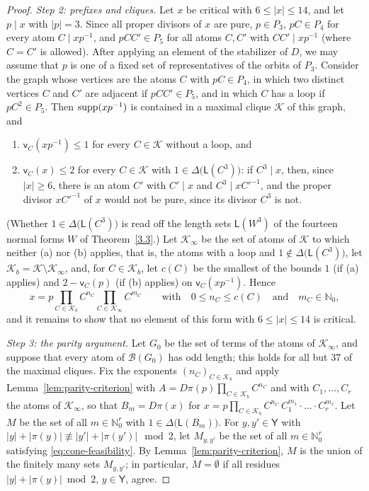 \documentclass[a4paper, 10pt]{amsart}
\theoremstyle{plain}
\theoremstyle{definition}
\theoremstyle{definition}
\newcommand{\N}{\mathbb N}
\numberwithin{equation}{section}
\begin{document}
\begin{proof}
\emph{Step 2: prefixes and cliques.}  Let $x$ be critical with
$6 \le |x| \le 14$, and let $p \mid x$ with $|p| = 3$.  Since all proper divisors of $x$ are
pure, $p \in P_3$, $pC \in P_4$ for every atom $C \mid xp^{-1}$, and
$pCC' \in P_5$ for all atoms $C, C'$ with $CC' \mid xp^{-1}$ (where $C = C'$ is
allowed).  After applying an element of the stabilizer of $D$, we may assume
that $p$ is one of a fixed set of representatives of the orbits of $P_3$.
Consider the graph whose vertices are the atoms $C$ with $pC \in P_4$, in
which two distinct vertices $C$ and $C'$ are adjacent if $pCC' \in P_5$, and
in which $C$ has a loop if $pC^2 \in P_5$.  Then $\operatorname{supp} (xp^{-1})$ is
contained in a maximal clique $\mathcal K$ of this graph, and
\begin{enumerate}
\item[(a)] $\mathsf v_C (xp^{-1}) \le 1$ for every $C \in \mathcal K$ without a
      loop, and
\item[(b)] $\mathsf v_C (x) \le 2$ for every $C \in \mathcal K$ with
      $1 \in \Delta \big(\mathsf L (C^3)\big)$: if $C^3 \mid x$, then, since
      $|x| \ge 6$, there is an atom $C'$ with $C' \mid x$ and $C^3 \mid xC'^{-1}$, and
      the proper divisor $xC'^{-1}$ of $x$ would not be pure, since its
      divisor $C^3$ is not.
\end{enumerate}
(Whether $1 \in \Delta \big(\mathsf L (C^3)\big)$ is read off the length sets
$\mathsf L (W^3)$ of the fourteen normal forms $W$ of Theorem~\ref{3.3}.)  Let
$\mathcal K_{\infty}$ be the set of atoms of $\mathcal K$ to which neither (a)
nor (b) applies, that is, the atoms with a loop and
$1 \notin \Delta \big(\mathsf L (C^3)\big)$, let
$\mathcal K_b = \mathcal K \setminus \mathcal K_{\infty}$, and, for
$C \in \mathcal K_b$, let $c(C)$ be the smallest of the bounds $1$ (if (a)
applies) and $2 - \mathsf v_C (p)$ (if (b) applies) on
$\mathsf v_C (xp^{-1})$.  Hence
\[
 x = p \prod_{C \in \mathcal K_{b}} C^{n_C} \prod_{C \in \mathcal K_{\infty}} C^{m_C}
 \qquad \text{with} \quad 0 \le n_C \le c(C) \quad \text{and} \quad m_C \in \N_0 ,
\]
and it remains to show that no element of this form with
$6 \le |x| \le 14$ is critical.

\emph{Step 3: the parity argument.}  Let $G_0$ be the set of terms of the atoms
of $\mathcal K_{\infty}$, and suppose that every atom of $\mathcal B (G_0)$ has
odd length; this holds for all but $37$ of the maximal cliques.  Fix the
exponents $(n_C)_{C \in \mathcal K_b}$ and apply
Lemma~\ref{lem:parity-criterion} with
$A = D\pi(p)\prod_{C \in \mathcal K_{b}} C^{n_C}$ and with
$C_1, \ldots, C_r$ the atoms of $\mathcal K_{\infty}$, so that
$B_m = D\pi(x)$ for
$x = p\prod_{C \in \mathcal K_b} C^{n_C}\, C_1^{m_1} \cdot \ldots \cdot C_r^{m_r}$.
Let $M$ be the set of all $m \in \N_0^r$ with
$1 \in \Delta \big(\mathsf L (B_m)\big)$.  For $y, y' \in \mathsf Y$ with
$|y| + |\pi(y)| \not\equiv |y'| + |\pi(y')| \mod 2$, let $M_{y,y'}$ be the
set of all $m \in \N_0^r$ satisfying \eqref{eq:cone-feasibility}.  By
Lemma~\ref{lem:parity-criterion}, $M$ is the union of the finitely many sets
$M_{y,y'}$; in particular, $M = \emptyset$ if all residues
$|y| + |\pi(y)| \bmod 2$, $y \in \mathsf Y$, agree.


\end{proof}
\end{document}
